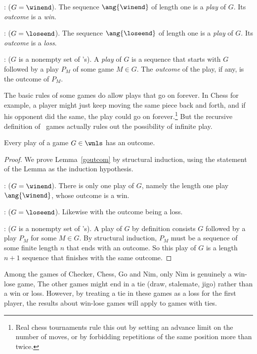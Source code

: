 \begin{definition}
\begin{definition*}
: ($G = \winend$).  The
sequence $\ang{\winend}$ of length one is a \emph{play} of $G$.  Its \emph{outcome}
is a \emph{win}.

: ($G = \loseend$).  The sequence $\ang{\loseend}$
of length one is a \emph{play} of $G$.  Its \emph{outcome} is a
\emph{loss}.

: ($G$ is a nonempty set of \wnls's).
A \emph{play} of $G$ is a sequence that starts with $G$ followed by a
play $P_M$ of some game $M \in G$.  The \emph{outcome} of the play, if
any, is the outcome of $P_M$.
\end{definition*}

The basic rules of some games do allow plays that go on forever.  In
Chess for example, a player might just keep moving the same piece back
and forth, and if his opponent did the same, the play could go on
forever.\footnote{Real chess tournaments rule this out by setting an
  advance limit on the number of moves, or by forbidding repetitions
  of the same position more than twice.}  But the recursive definition
of \wnls\ games actually rules out the possibility of infinite play.

\begin{lemma}\label{goutcom}
Every play of a game $G \in \wnls$ has an outcome.
\end{lemma}

\begin{proof}
We prove Lemma~\ref{goutcom} by structural induction, using the
statement of the Lemma as the induction hypothesis.

: ($G = \winend$).  There is only one play of
$G$, namely the length one play $\ang{\winend}$, whose outcome is a
win.

: ($G= \loseend$).  Likewise with the outcome
being a loss.

: ($G$ is a nonempty set of \wnls's).
A play of $G$ by definition consists $G$ followed by a play $P_M$ for
some $M \in G$.  By structural induction, $P_M$ must be a sequence of
some finite length $n$ that ends with an outcome.  So this play of $G$
is a length $n+1$ sequence that finishes with the same outcome.
\end{proof}

Among the games of Checker, Chess, Go and Nim, only Nim is genuinely a
win-lose game,   The other games might end in a tie (draw, stalemate,
jigo) rather than a win or loss.  However, by treating a tie in these
games as a loss for the first player, the results about win-lose games
will apply to games with ties.


\end{definition}

